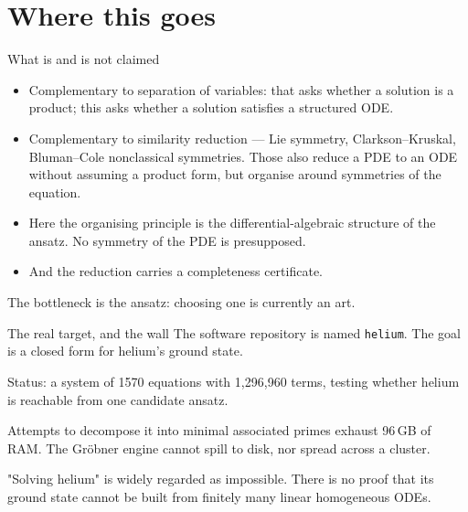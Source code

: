 \documentclass[10pt,aspectratio=169]{beamer}
\begin{document}

\section{Where this goes}

\begin{frame}{What is and is not claimed}
\begin{itemize}
  \item \alert{Complementary} to separation of variables: that asks whether a
        solution is a product; this asks whether a solution satisfies a
        structured ODE.
  \item \alert{Complementary} to similarity reduction --- Lie symmetry,
        Clarkson--Kruskal, Bluman--Cole nonclassical symmetries. Those also reduce
        a PDE to an ODE without assuming a product form, but organise around
        symmetries of the equation.
  \item Here the organising principle is the \alert{differential-algebraic
        structure of the ansatz}. No symmetry of the PDE is presupposed.
  \item And the reduction carries a \alert{completeness certificate}.
\end{itemize}

\pause
\bigskip
The bottleneck is the ansatz: choosing one is currently an art.
\end{frame}

\begin{frame}{The real target, and the wall}
The software repository is named \texttt{helium}. The goal is a closed form for
helium's ground state.

\pause
\medskip
Status: a system of \alert{1570 equations} with \alert{1{,}296{,}960 terms},
testing whether helium is reachable from one candidate ansatz.

\pause
\medskip
Attempts to decompose it into minimal associated primes \alert{exhaust 96\,GB of
RAM}. The Gr\"obner engine cannot spill to disk, nor spread across a cluster.

\pause
\bigskip
\begin{alertblock}{}
"Solving helium" is widely regarded as impossible. There is no proof that its
ground state cannot be built from finitely many linear homogeneous ODEs.
\end{alertblock}
\end{frame}
\end{document}
